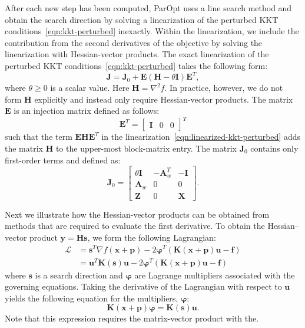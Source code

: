 \documentclass[12pt]{article}
\newcommand{\mb}{\mathbf}
\newcommand{\mbs}{\boldsymbol}
\begin{document}
After each new step has been computed, ParOpt uses a line search method and
obtain the search direction by solving a linearization of the
perturbed KKT conditions~\eqref{eqn:kkt-perturbed} inexactly. Within
the linearization, we include the contribution from the second
derivatives of the objective by solving the linearization with
Hessian-vector products. The exact linearization of the perturbed KKT
conditions~\eqref{eqn:kkt-perturbed} takes the following form:
\begin{equation}
  \label{eqn:linearized-kkt-perturbed}
  \mb{J} = \mb{J}_{0} + \mb{E} (\mb{H} - \theta\mb{I}) \mb{E}^{T},
\end{equation}
where $\theta \ge 0$ is a scalar value.  Here $\mb{H} = \nabla^{2}
f$. In practice, however, we do not form $\mb{H}$ explicitly and
instead only require Hessian-vector products. The matrix $\mb{E}$ is
an injection matrix defined as follows:
%
\begin{equation*}
  \mb{E}^{T} = \begin{bmatrix} \mb{I} & 0 & 0 \end{bmatrix}^{T}
\end{equation*}
such that the term $\mb{E}\mb{H}\mb{E}^{T}$ in the
linearization~\eqref{eqn:linearized-kkt-perturbed} adds the matrix
$\mb{H}$ to the upper-most block-matrix entry.  The matrix
$\mb{J}_{0}$ contains only first-order terms and defined as:
\begin{equation}
  \mb{J}_{0} = \begin{bmatrix}
    \theta \mb{I} & -\mb{A}_{w}^{T} & -\mb{I} \\
    \mb{A}_{w} & 0 & 0 \\
    \mb{Z} & 0 & \mb{X} 
  \end{bmatrix}.
\end{equation}

Next we illustrate how the Hessian-vector products can be obtained
from methods that are required to evaluate the first derivative.  To
obtain the Hessian--vector product $\mb{y} = \mb{H}\mb{s}$, we form
the following Lagrangian:
\begin{equation}
  \label{eqn:second-order-lagrangian}
  \begin{aligned}
    \mathcal{L} & = \mb{s}^{T} \nabla f(\mb{x} + \mb{p}) - 
    2\mbs{\varphi}^{T}\left(\mb{K}(\mb{x} + \mb{p}) \mb{u} - \mb{f}\right) \\
    & = \mb{u}^{T} \mb{K}(\mb{s}) \mb{u} - 
    2\mbs{\varphi}^{T}\left(\mb{K}(\mb{x} + \mb{p}) \mb{u} - \mb{f}\right) 
  \end{aligned}
\end{equation}
where $\mb{s}$ is a search direction and $\mbs{\varphi}$ are Lagrange
multipliers associated with the governing equations. Taking the
derivative of the Lagrangian with respect to $\mb{u}$ yields the
following equation for the multipliers, $\mbs{\varphi}$:
\begin{equation}
  \mb{K}(\mb{x} + \mb{p})\mbs{\varphi} = \mb{K}(\mb{s})\mb{u}.
\end{equation}
Note that this expression requires the matrix-vector product with the. 
\end{document}
